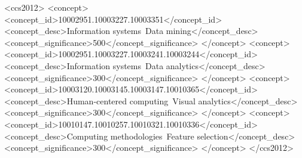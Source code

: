 \documentclass{sig-alternate-05-2015}
\begin{document}
\begin{CCSXML}
<ccs2012>
<concept>
<concept_id>10002951.10003227.10003351</concept_id>
<concept_desc>Information systems~Data mining</concept_desc>
<concept_significance>500</concept_significance>
</concept>
<concept>
<concept_id>10002951.10003227.10003241.10003244</concept_id>
<concept_desc>Information systems~Data analytics</concept_desc>
<concept_significance>300</concept_significance>
</concept>
<concept>
<concept_id>10003120.10003145.10003147.10010365</concept_id>
<concept_desc>Human-centered computing~Visual analytics</concept_desc>
<concept_significance>300</concept_significance>
</concept>
<concept>
<concept_id>10010147.10010257.10010321.10010336</concept_id>
<concept_desc>Computing methodologies~Feature selection</concept_desc>
<concept_significance>300</concept_significance>
</concept>
</ccs2012>
\end{CCSXML}


\printccsdesc







\balance

\end{document}
